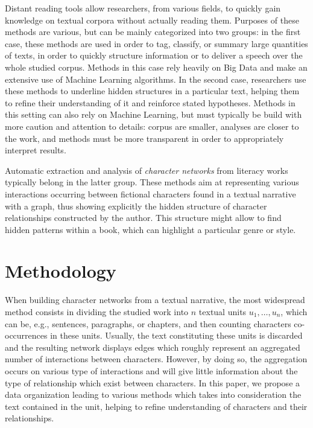 \documentclass[
twocolumn,
]{ceurart}
\begin{document}
Distant reading tools allow researchers, from various fields, to quickly gain knowledge on textual corpora without actually reading them. Purposes of these methods are various, but can be mainly categorized into two groups: in the first case, these methods are used in order to tag, classify, or summary large quantities of texts, in order to quickly structure information or to deliver a speech over the whole studied corpus. Methods in this case rely heavily on Big Data and make an extensive use of Machine Learning algorithms. In the second case, researchers use these methods to underline hidden structures in a particular text, helping them to refine their understanding of it and reinforce stated hypotheses. Methods in this setting can also rely on Machine Learning, but must typically be build with more caution and attention to details: corpus are smaller, analyses are closer to the work, and methods must be more transparent in order to appropriately interpret results.

Automatic extraction and analysis of \emph{character networks} from literacy works typically belong in the latter group. These methods aim at representing various interactions occurring between fictional characters found in a textual narrative with a graph, thus showing explicitly the hidden structure of character relationships constructed by the author. This structure might allow to find hidden patterns within a book, which can highlight a particular genre or style.

\section{Methodology}


When building character networks from a textual narrative, the most widespread method consists in dividing the studied work into $n$ textual units $u_1, \ldots, u_n$, which can be, e.g., sentences, paragraphs, or chapters, and then counting characters co-occurrences in these units. Usually, the text constituting these units is discarded and the resulting network displays edges which roughly represent an aggregated number of interactions between characters. However, by doing so, the aggregation occurs on various type of interactions and will give little information about the type of relationship which exist between characters. In this paper, we propose a data organization leading to various methods which takes into consideration the text contained in the unit, helping to refine understanding of characters and their relationships.
\end{document}
